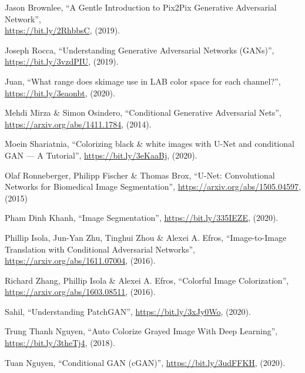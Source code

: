 \documentclass[a4paper]{article}
\begin{document}
\begin{thebibliography}{80}
     Jason Brownlee, ``A Gentle Introduction to Pix2Pix Generative Adversarial Network'',\\ \href{https://bit.ly/2RhbbsC}{https://bit.ly/2RhbbsC}, (2019).

     Joseph Rocca, ``Understanding Generative Adversarial Networks (GANs)'', \href{https://bit.ly/3vzdPIU}{https://bit.ly/3vzdPIU}, (2019).

     Juan, ``What range does skimage use in LAB color space for each channel?'', \href{https://bit.ly/3eaonbt}{https://bit.ly/3eaonbt}, (2020).

     Mehdi Mirza \& Simon Osindero, ``Conditional Generative Adversarial Nets'',\\ \href{https://arxiv.org/abs/1411.1784}{https://arxiv.org/abs/1411.1784}, (2014).

     Moein Shariatnia, ``Colorizing black \& white images with U-Net and conditional GAN — A Tutorial'', \href{https://bit.ly/3eKaaBj}{https://bit.ly/3eKaaBj}, (2020).

     Olaf Ronneberger, Philipp Fischer \& Thomas Brox, ``U-Net: Convolutional Networks for Biomedical Image Segmentation'', \href{https://arxiv.org/abs/1505.04597}{https://arxiv.org/abs/1505.04597}, (2015)

     Pham Dinh Khanh, ``Image Segmentation'', \href{https://bit.ly/335IEZE}{https://bit.ly/335IEZE}, (2020).

     Phillip Isola, Jun-Yan Zhu, Tinghui Zhou \& Alexei A. Efros, ``Image-to-Image Translation with Conditional Adversarial Networks'', \href{https://arxiv.org/abs/1611.07004}{https://arxiv.org/abs/1611.07004}, (2016).

     Richard Zhang, Phillip Isola \& Alexei A. Efros, ``Colorful Image Colorization'',\\ \href{https://arxiv.org/abs/1603.08511}{https://arxiv.org/abs/1603.08511}, (2016).

     Sahil, ``Understanding PatchGAN'', \href{https://bit.ly/3xJy0Wo}{https://bit.ly/3xJy0Wo}, (2020).

     Trung Thanh Nguyen, ``Auto Colorize Grayed Image With Deep Learning'', \href{https://bit.ly/3theTj4}{https://bit.ly/3theTj4}, (2018).

     Tuan Nguyen, ``Conditional GAN (cGAN)'', \href{https://bit.ly/3udFFKH}{https://bit.ly/3udFFKH}, (2020).


\end{thebibliography}
\end{document}
